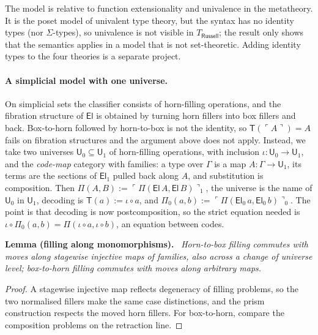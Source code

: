 \documentclass[11pt]{article}
\newenvironment{lemma}[1]{\par\medskip\noindent\textbf{Lemma #1.}\ \itshape}{\par\medskip}
\theoremstyle{definition}
\theoremstyle{remark}
\newcommand{\U}{\mathsf U}
\newcommand{\T}{\mathsf T}
\newcommand{\code}[1]{\ulcorner #1\urcorner}
\begin{document}
The model is relative to function extensionality and univalence in the
metatheory. It is the poset model of univalent type theory, but the
syntax has no identity types (nor $\Sigma$-types), so univalence is not
visible in $T_{\mathsf{Russell}}$; the result only shows that the
semantics applies in a model that is not set-theoretic. Adding identity
types to the four theories is a separate project.

\paragraph{A simplicial model with one universe.} On simplicial sets the
classifier consists of horn-filling operations, and the fibration
structure of $\mathsf{El}$ is obtained by turning horn fillers into box
fillers and back. Box-to-horn followed by horn-to-box is not the identity,
so $\T(\code{A})=A$ fails on fibration structures and the argument above
does not apply. Instead, we take two universes $\U_0\subseteq\U_1$ of
horn-filling operations, with inclusion $\iota:\U_0\to\U_1$, and the
\emph{code-map} category with families: a type over $\Gamma$ is a map
$A:\Gamma\to\U_1$, its terms are the sections of $\mathsf{El}_1$ pulled
back along $A$, and substitution is composition. Then
$\Pi(A,B):=\code{\Pi(\mathsf{El}\,A,\mathsf{El}\,B)}_1$, the universe is
the name of $\U_0$ in $\U_1$, decoding is $\T(a):=\iota\circ a$, and
$\Pi_0(a,b):=\code{\Pi(\mathsf{El}_0\,a,\mathsf{El}_0\,b)}_0$. The point is
that decoding is now postcomposition, so the strict equation needed is
$\iota\circ\Pi_0(a,b)=\Pi(\iota\circ a,\iota\circ b)$, an equation between
codes.

\begin{lemma}{(filling along monomorphisms)}
Horn-to-box filling commutes with moves along stagewise injective maps of
families, also across a change of universe level; box-to-horn filling
commutes with moves along arbitrary maps.
\end{lemma}
\begin{proof}
A stagewise injective map reflects degeneracy of filling problems, so the
two normalised fillers make the same case distinctions, and the prism
construction respects the moved horn fillers. For box-to-horn, compare the
composition problems on the retraction line.
\end{proof}
\end{document}
